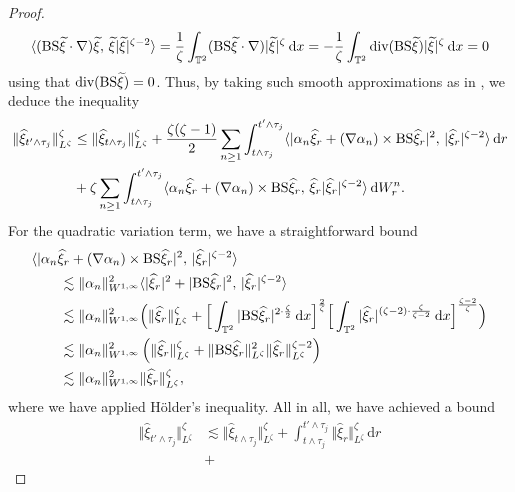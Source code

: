 \documentclass[11pt, a4paper,oneside, reqno]{amsart}
\theoremstyle{remark} %
\theoremstyle{definition} %
\numberwithin{theorem}{section}
\numberwithin{equation}{section}
\newcommand{\abs}[1]{\vert #1 \vert}
\newcommand{\norm}[1]{\Vert #1 \Vert}
\newcommand{\inner}[2]{\langle #1,\, #2 \rangle}
\newcommand{\BS}{{\rm BS}}
\newcommand{\T}{\mathbb{T}}
\newcommand{\grad}{\nabla}
\renewcommand{\tilde}[1]{\widetilde{#1}}
\renewcommand{\hat}[1]{\widehat{#1}}
\newcommand{\dd}{\hspace{2pt}\mathrm{d}}
\begin{document}
\begin{proof}
\begin{align*}
    \inner{(\BS\tilde{\xi} \cdot \grad)\tilde{\xi}}{\tilde{\xi}\abs{\tilde{\xi}}^{\zeta-2}} = \frac{1}{\zeta}\int_{\T^2}(\BS\tilde{\xi} \cdot \grad)\abs{\tilde{\xi}}^{\zeta} \dd x = -\frac{1}{\zeta}\int_{\T^2}\textnormal{div}(\BS\tilde{\xi})\abs{\tilde{\xi}}^{\zeta} \dd x = 0
\end{align*}
using that $\textnormal{div}(\BS\tilde{\xi}) = 0$. Thus, by taking such smooth approximations as in \cite[Lemma 8.21]{AV25_survey}, we deduce the inequality
\begin{align*}
    \norm{\hat{\xi}_{t' \wedge \tau_j}}_{L^{\zeta}}^{\zeta}  &\leq \norm{\hat{\xi}_{t \wedge \tau_j}}_{L^{\zeta}}^{\zeta} + \frac{\zeta(\zeta-1)}{2} \sum_{n \geq 1} \int_{t \wedge \tau_j}^{t'\wedge\tau_j}\inner{\abs{\alpha_n\hat{\xi}_r + (\nabla \alpha_n) \times \BS\hat{\xi}_r}^2}{\abs{\hat{\xi}_r}^{\zeta-2}}\dd r\\ &+
    \zeta \sum_{n \geq 1} \int_{t \wedge \tau_j}^{t'\wedge\tau_j}\inner{\alpha_n\hat{\xi}_r + (\nabla \alpha_n) \times \BS\hat{\xi}_r}{\hat{\xi}_r\abs{\hat{\xi}_r}^{\zeta-2}}\dd W^n_r.
\end{align*}
For the quadratic variation term, we have a straightforward bound
\begin{align*}
   &\inner{\abs{\alpha_n\hat{\xi}_r + (\nabla \alpha_n) \times \BS\hat{\xi}_r}^2}{\abs{\hat{\xi}_r}^{\zeta-2}}\\ & \qquad \lesssim \norm{\alpha_n}_{W^{1,\infty}}^2 \inner{\abs{\hat{\xi}_r}^2 + \abs{\BS\hat{\xi}_r}^2}{\abs{\hat{\xi}_r}^{\zeta-2}}\\
   & \qquad \lesssim \norm{\alpha_n}_{W^{1,\infty}}^2\Big(\norm{\hat{\xi}_r}_{L^{\zeta}}^{\zeta} + \Big[\int_{\T^2}\abs{\BS\hat{\xi}_r}^{2 \cdot \frac{\zeta}{2}}\dd x \Big]^{\frac{2}{\zeta}}\Big[\int_{\T^2}\abs{\hat{\xi}_r}^{(\zeta-2) \cdot \frac{\zeta}{\zeta - 2}}\dd x  \Big]^{\frac{\zeta-2}{\zeta}} \Big)\\
   & \qquad \lesssim \norm{\alpha_n}_{W^{1,\infty}}^2\left(\norm{\hat{\xi}_r}_{L^{\zeta}}^{\zeta} + \norm{\BS\hat{\xi}_r}_{L^{\zeta}}^{2}\norm{\hat{\xi}_r}_{L^{\zeta}}^{\zeta-2} \right)\\
   & \qquad \lesssim \norm{\alpha_n}_{W^{1,\infty}}^2\norm{\hat{\xi}_r}_{L^{\zeta}}^{\zeta},
\end{align*}
where we have applied H\"{o}lder's inequality. All in all, we have achieved a bound
\begin{align*}
    \norm{\hat{\xi}_{t' \wedge \tau_j}}_{L^{\zeta}}^{\zeta}  &\lesssim \norm{\hat{\xi}_{t \wedge \tau_j}}_{L^{\zeta}}^{\zeta} +  \int_{t \wedge \tau_j}^{t'\wedge\tau_j}\norm{\hat{\xi}_r}_{L^{\zeta}}^{\zeta}\dd r\\ &+

\end{align*}
\end{proof}
\end{document}
